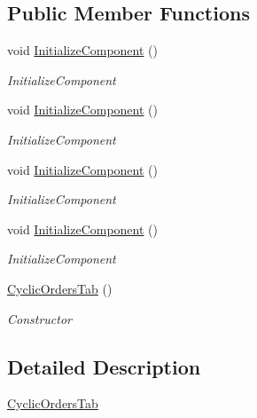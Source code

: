 \subsection*{Public Member Functions}
\begin{DoxyCompactItemize}
\item 
void \hyperlink{class_baudi_1_1_client_1_1_view_1_1_tabs_1_1_cyclic_orders_tab_a9e4dbe1faf6fc4801d45ae31415f4ee5}{Initialize\+Component} ()
\begin{DoxyCompactList}\small\item\em Initialize\+Component \end{DoxyCompactList}\item 
void \hyperlink{class_baudi_1_1_client_1_1_view_1_1_tabs_1_1_cyclic_orders_tab_a9e4dbe1faf6fc4801d45ae31415f4ee5}{Initialize\+Component} ()
\begin{DoxyCompactList}\small\item\em Initialize\+Component \end{DoxyCompactList}\item 
void \hyperlink{class_baudi_1_1_client_1_1_view_1_1_tabs_1_1_cyclic_orders_tab_a9e4dbe1faf6fc4801d45ae31415f4ee5}{Initialize\+Component} ()
\begin{DoxyCompactList}\small\item\em Initialize\+Component \end{DoxyCompactList}\item 
void \hyperlink{class_baudi_1_1_client_1_1_view_1_1_tabs_1_1_cyclic_orders_tab_a9e4dbe1faf6fc4801d45ae31415f4ee5}{Initialize\+Component} ()
\begin{DoxyCompactList}\small\item\em Initialize\+Component \end{DoxyCompactList}\item 
\hyperlink{class_baudi_1_1_client_1_1_view_1_1_tabs_1_1_cyclic_orders_tab_a078b349ccccf77066837ce94d5ce7c1b}{Cyclic\+Orders\+Tab} ()
\begin{DoxyCompactList}\small\item\em Constructor \end{DoxyCompactList}\end{DoxyCompactItemize}


\subsection{Detailed Description}
\hyperlink{class_baudi_1_1_client_1_1_view_1_1_tabs_1_1_cyclic_orders_tab}{Cyclic\+Orders\+Tab} 

